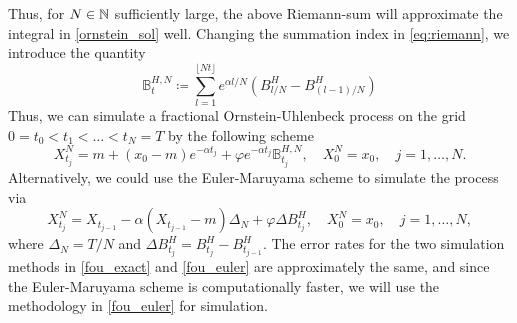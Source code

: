 Thus, for $N\in\mathbb{N}$ sufficiently large, the above Riemann-sum will approximate the integral in \eqref{ornstein_sol} well. Changing the summation index in \eqref{eq:riemann}, we introduce the quantity
\begin{equation}
    \mathbb{B}_{t}^{H,N}\coloneqq \sum_{l=1}^{\lfloor Nt\rfloor }e^{\alpha l/N}\left(B^{H}_{l/N}-B^{H}_{(l-1)/N}\right)
\end{equation}
Thus, we can simulate a fractional Ornstein-Uhlenbeck process on the grid $0=t_{0}<t_{1}<\dots<t_{N}=T$ by the following scheme
\begin{equation}\label{fou_exact}
    X_{t_{j}}^{N}=m + (x_{0}-m)e^{-\alpha t_{j}} + \varphi e^{-\alpha t_{j}}\mathbb{B}_{t_{j}}^{H,N},\quad X_{0}^{N}=x_{0}, \quad j=1,\dots,N.
\end{equation}
Alternatively, we could use the Euler-Maruyama scheme to simulate the process via
\begin{equation}\label{fou_euler}
    X_{t_{j}}^{N}=X_{t_{j-1}} -\alpha(X_{t_{j-1}}-m)\Delta_{N} + \varphi\Delta B_{t_{j}}^{H},\quad X_{0}^{N}=x_{0},\quad j=1,\dots,N,
\end{equation}
where $\Delta_{N}=T/N$ and $\Delta B_{t_{j}}^{H}=B^{H}_{t_{j}}-B^{H}_{t_{j-1}}$. The error rates for the two simulation methods in \eqref{fou_exact} and \eqref{fou_euler} are approximately the same, and since the Euler-Maruyama scheme is computationally faster, we will use the methodology in \eqref{fou_euler} for simulation.

